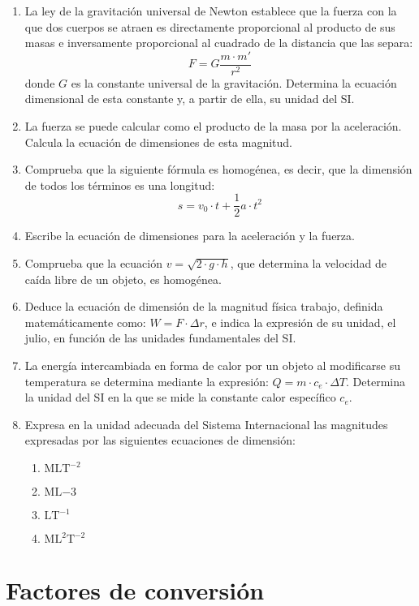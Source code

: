 \documentclass[
]{article}
\providecommand{\tightlist}{%
  \setlength{\itemsep}{0pt}\setlength{\parskip}{0pt}}
\begin{document}
\begin{enumerate}
\def\labelenumi{\arabic{enumi}.}
\item
  La ley de la gravitación universal de Newton establece que la fuerza
  con la que dos cuerpos se atraen es directamente proporcional al
  producto de sus masas e inversamente proporcional al cuadrado de la
  distancia que las separa: \[F = G\frac{m \cdot m'}{r^2}\] donde \(G\)
  es la constante universal de la gravitación. Determina la ecuación
  dimensional de esta constante y, a partir de ella, su unidad del SI.
\item
  La fuerza se puede calcular como el producto de la masa por la
  aceleración. Calcula la ecuación de dimensiones de esta magnitud.
\item
  Comprueba que la siguiente fórmula es homogénea, es decir, que la
  dimensión de todos los términos es una longitud:
  \[s = v_0 \cdot t + \frac{1}{2} a \cdot t^2\]
\item
  Escribe la ecuación de dimensiones para la aceleración y la fuerza.
\item
  Comprueba que la ecuación \(v = \sqrt{2 \cdot g \cdot h}\), que
  determina la velocidad de caída libre de un objeto, es homogénea.
\item
  Deduce la ecuación de dimensión de la magnitud física trabajo,
  definida matemáticamente como: \(W = F \cdot \Delta r\), e indica la
  expresión de su unidad, el julio, en función de las unidades
  fundamentales del SI.
\item
  La energía intercambiada en forma de calor por un objeto al
  modificarse su temperatura se determina mediante la expresión:
  \(Q = m \cdot c_e \cdot \Delta T\). Determina la unidad del SI en la
  que se mide la constante calor específico \(c_e\).
\item
  Expresa en la unidad adecuada del Sistema Internacional las magnitudes
  expresadas por las siguientes ecuaciones de dimensión:

  \begin{enumerate}
  \def\labelenumii{\alph{enumii})}
  \tightlist
  \item
    \(\mathrm{MLT^{-2}}\)
  \item
    \(\mathrm{ML{-3}}\)
  \item
    \(\mathrm{LT^{-1}}\)
  \item
    \(\mathrm{ML^2T^{-2}}\)
  \end{enumerate}
\end{enumerate}

\hypertarget{factores-de-conversiuxf3n}{%
\section{Factores de conversión}\label{factores-de-conversiuxf3n}}
\end{document}
